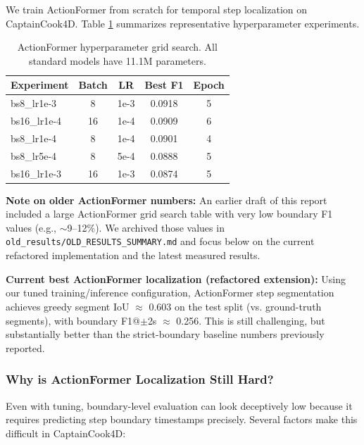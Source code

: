 \documentclass[10pt,twocolumn,letterpaper]{article}
\newcommand{\tighttabcolsep}{\setlength{\tabcolsep}{3pt}}
\newcommand{\tighttablerowstretch}{\renewcommand{\arraystretch}{1.05}}
\begin{document}
We train ActionFormer from scratch for temporal step localization on CaptainCook4D. Table \ref{tab:actionformer_main} summarizes representative hyperparameter experiments.

\begin{table}[h]
\centering
\caption{ActionFormer hyperparameter grid search. All standard models have 11.1M parameters.}
\label{tab:actionformer_main}
{\small\tighttabcolsep\tighttablerowstretch
\begin{tabular}{lcccc}
\toprule
Experiment & Batch & LR & Best F1 & Epoch \\
\midrule
bs8\_lr1e-3 & 8 & 1e-3 & 0.0918 & 5 \\
bs16\_lr1e-4 & 16 & 1e-4 & 0.0909 & 6 \\
bs8\_lr1e-4 & 8 & 1e-4 & 0.0901 & 4 \\
bs8\_lr5e-4 & 8 & 5e-4 & 0.0888 & 5 \\
bs16\_lr1e-3 & 16 & 1e-3 & 0.0874 & 5 \\
\bottomrule
\end{tabular}
}
\end{table}

\textbf{Note on older ActionFormer numbers:} An earlier draft of this report included a large ActionFormer grid search table with very low boundary F1 values (e.g., $\sim$9--12\%). We archived those values in \texttt{old\_results/OLD\_RESULTS\_SUMMARY.md} and focus below on the current refactored implementation and the latest measured results.

\textbf{Current best ActionFormer localization (refactored extension):} Using our tuned training/inference configuration, ActionFormer step segmentation achieves greedy segment IoU $\approx$ 0.603 on the test split (vs. ground-truth segments), with boundary F1@$\pm$2s $\approx$ 0.256. This is still challenging, but substantially better than the strict-boundary baseline numbers previously reported.

\subsubsection{Why is ActionFormer Localization Still Hard?}

Even with tuning, boundary-level evaluation can look deceptively low because it requires predicting step boundary timestamps precisely. Several factors make this difficult in CaptainCook4D:
\end{document}
